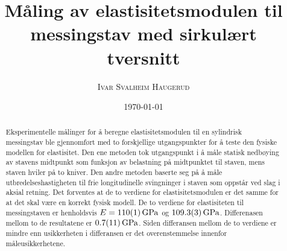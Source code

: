 \documentclass[%
 reprint,
 amsmath,amssymb,
 aps,
 norsk,
 booktabs
]{revtex4-1}
\begin{document}
\title{Måling av elastisitetsmodulen til messingstav med sirkulært tversnitt}
\author{\textsc{Ivar Svalheim Haugerud}}
\date{\today}

\begin{abstract}
  Eksperimentelle målinger for å beregne elastisitetsmodulen til en sylindrisk messingstav ble gjennomført med to forskjellige utgangspunkter for å teste den fysiske modellen for elastisitet. Den ene metoden tok utgangspunkt i å måle statisk nedbøying av stavens midtpunkt som funksjon av belastning på midtpunktet til staven, mens staven hviler på to kniver. Den andre metoden baserte seg på å måle utbredelseshastigheten til frie longitudinelle svingninger i staven som oppstår ved slag i aksial retning. Det forventes at de to verdiene for elastisitetsmodulen er det samme for at det skal være en korrekt fysisk modell. De to verdiene for elastisiteten til messingstaven er henholdsvis
  $E=\SI{110\pm1}{\giga\pascal}$ og $\SI{109.3\pm0.3}{\giga\pascal}$. Differenasen mellom to de resultatene er $\SI{0.7\pm1.1}{\giga\pascal}$. Siden differansen mellom de to verdiene er mindre enn usikkerheten i differansen er det overenstemmelse innenfor måleusikkerhetene.
\end{abstract}

\maketitle

\end{document}
